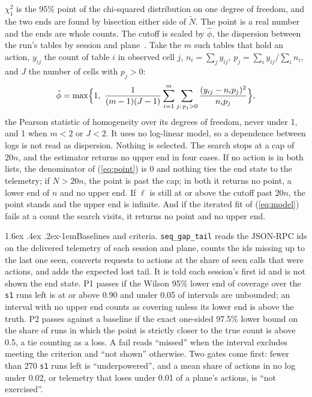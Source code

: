 \documentclass[11pt]{article}
\makeatletter
\renewcommand\paragraph{\@startsection{paragraph}{4}{\z@}%
  {1.6ex \@plus .4ex \@minus .2ex}{-1em}{\normalfont\normalsize\bfseries}}
\makeatother
\begin{document}
$\chi^2_{1}$ is the 95\% point of the chi-squared distribution on one degree of freedom,
and the two ends are found by bisection either side of $\tilde N$. The point is a real
number and the ends are whole counts. The cutoff is scaled by $\hat\phi$, the dispersion
between the run's tables by session and plane~\citep{wedderburn1974quasi,mccullagh1989glm}.
Take the $m$ such tables that hold an action, $y_{ij}$ the count of table $i$ in observed
cell $j$, $n_i=\sum_j y_{ij}$, $p_j=\sum_i y_{ij}/\sum_i n_i$, and $J$ the number of cells
with $p_j>0$:
\begin{equation}
\hat\phi=\max\Bigl\{1,\ \frac{1}{(m-1)(J-1)}\sum_{i=1}^{m}\sum_{j:\,p_j>0}
\frac{(y_{ij}-n_i p_j)^2}{n_i p_j}\Bigr\},
\label{eq:phi}
\end{equation}
the Pearson statistic of homogeneity over its degrees of freedom, never under 1, and 1
when $m<2$ or $J<2$. It uses no log-linear model, so a dependence between logs is not
read as dispersion. Nothing is selected. The search stops at a cap of $20n$, and the
estimator returns no upper end in four cases. If no action is in both lists, the
denominator of (\ref{eq:point}) is 0 and nothing ties the end state to the telemetry; if
$\hat N>20n$, the point is past the cap; in both it returns no point, a lower end of $n$
and no upper end. If $\ell$ is still at or above the cutoff past $20n$,
the point stands and the upper end is infinite. And if the iterated fit of
(\ref{eq:model}) fails at a count the search visits, it returns no point and no upper end.

\paragraph{Baselines and criteria.} \texttt{seq\_gap\_tail} reads the JSON-RPC ids on
the delivered telemetry of each session and plane, counts the ids missing up to the last
one seen, converts requests to actions at the share of seen calls that were actions, and
adds the expected lost tail. It is told each session's first id and is not shown the end
state. P1 passes if the Wilson 95\% lower end of coverage over the \texttt{s1} runs left
is at or above 0.90 and under 0.05 of intervals are unbounded; an interval with no upper
end counts as covering unless its lower end is above the truth. P2 passes against a
baseline if the exact one-sided 97.5\% lower bound on the share of runs in which the
point is strictly closer to the true count is above 0.5, a tie counting as a loss. A
fail reads ``missed'' when the interval excludes meeting the criterion and ``not shown''
otherwise. Two gates come first: fewer than 270 \texttt{s1} runs left is
``underpowered'', and a mean share of actions in no log under 0.02, or telemetry that
loses under 0.01 of a plane's actions, is ``not exercised''.
\end{document}
